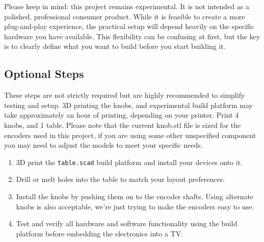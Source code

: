 \documentclass[]{article}
\begin{document}
Please keep in mind: this project remains experimental. It is not intended as a polished, professional consumer product.  
While it is feasible to create a more plug-and-play experience, the practical setup will depend heavily on the specific hardware you have available.
This flexibility can be confusing at first, but the key is to clearly define what you want to build before you start building it.

\subsection*{Optional Steps}

These steps are not strictly required but are highly recommended to simplify testing and setup. 3D printing the knobs, and experimental build platform may take approximately an hour of printing, depending on your printer. Print 4 knobs, and 1 table. Please note that the current knob.stl file is sized for the encoders used in this project, if you are using some other unspecified component you may need to adjust the models to meet your specific needs. 

\begin{enumerate}
	\item 3D print the \texttt{table.scad} build platform and install your devices onto it.
	\item Drill or melt holes into the table  to match your layout preferences. 
	\item Install the knobs by pushing them on to the encoder shafts. Using alternate knobs is also acceptable, we're just trying to make the encoders easy to use.
	\item Test and verify all hardware and software functionality using the build platform before embedding the electronics into a TV.
\end{enumerate}
\end{document}
